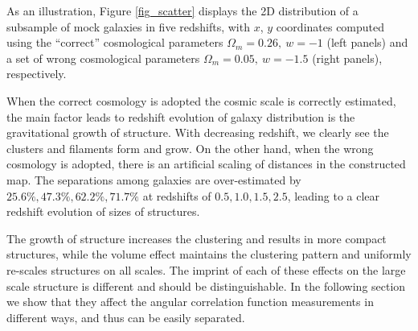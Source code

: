 \documentclass[iop]{emulateapj}
\newcommand{\hMsun}{{\ifmmode{h^{-1}{\rm
        {M_{\odot}}}}\else{$h^{-1}{\rm{M_{\odot}}}$~}\fi}}
\begin{document}
As an illustration, Figure \ref{fig_scatter} displays the 2D distribution of a subsample of mock galaxies in five redshifts,
with $x$, $y$ coordinates computed using the ``correct'' cosmological parameters $\Omega_m=0.26,\ w=-1$ (left panels) 
and a set of wrong cosmological parameters $\Omega_m=0.05,\ w=-1.5$ (right panels), respectively.

When the correct cosmology is adopted the cosmic scale is correctly estimated,
the main factor leads to redshift evolution of galaxy distribution is the gravitational growth of structure.
With decreasing redshift, we clearly see the clusters and filaments form and grow.
On the other hand, when the wrong cosmology is adopted, there is an artificial scaling of distances in the constructed map.
The separations among galaxies are over-estimated by 
$25.6\%,47.3\%,62.2\%,71.7\%$ at redshifts of $0.5,1.0,1.5,2.5$,
leading to a clear redshift evolution of sizes of structures.

The growth of structure increases the clustering and results in more compact structures,
while the volume effect maintains the clustering pattern and uniformly re-scales structures on all scales.
The imprint of each of these effects on the large scale structure is different and should be distinguishable.
In the following section we show that they affect the angular correlation function measurements in different ways, 
and thus can be easily separated.





\end{document}
